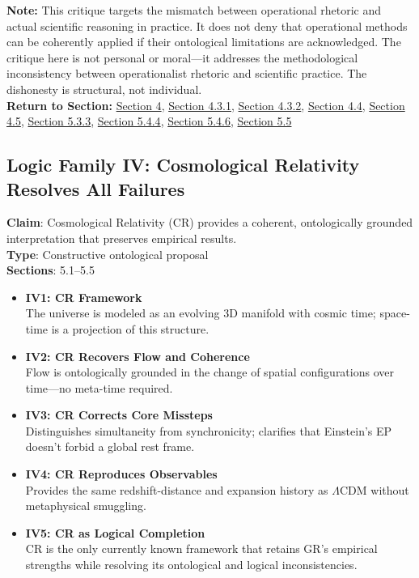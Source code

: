 \documentclass[12pt]{book}
\begin{document}
\textbf{Note:} This critique targets the mismatch between operational rhetoric and actual scientific reasoning in practice. It does not deny that operational methods can be coherently applied if their ontological limitations are acknowledged. The critique here is not personal or moral---it addresses the methodological inconsistency between operationalist rhetoric and scientific practice. The dishonesty is structural, not individual.\\
\textbf{Return to Section:} \hyperref[sec:4]{Section 4}, \hyperref[sec:4.3.1]{Section 4.3.1}, \hyperref[sec:4.3.2]{Section 4.3.2}, \hyperref[sec:4.4]{Section 4.4}, \hyperref[sec:4.5]{Section 4.5}, \hyperref[sec:5.3.3]{Section 5.3.3}, \hyperref[sec:5.4.4]{Section 5.4.4}, \hyperref[sec:5.4.6]{Section 5.4.6}, \hyperref[sec:5.5]{Section 5.5}

\vspace{1em}

\subsection*{Logic Family IV: Cosmological Relativity Resolves All Failures}
\textbf{Claim}: Cosmological Relativity (CR) provides a coherent, ontologically grounded interpretation that preserves empirical results.\\
\textbf{Type}: Constructive ontological proposal\\
\textbf{Sections}: 5.1–5.5
\begin{itemize}
  \item \textbf{IV1: CR Framework} \\
  The universe is modeled as an evolving 3D manifold with cosmic time; space-time is a projection of this structure.
  \item \textbf{IV2: CR Recovers Flow and Coherence} \\
  Flow is ontologically grounded in the change of spatial configurations over time---no meta-time required.
  \item \textbf{IV3: CR Corrects Core Missteps} \\
  Distinguishes simultaneity from synchronicity; clarifies that Einstein's EP doesn't forbid a global rest frame.
  \item \textbf{IV4: CR Reproduces Observables} \\
  Provides the same redshift-distance and expansion history as $\Lambda$CDM without metaphysical smuggling.
  \item \textbf{IV5: CR as Logical Completion} \\
  CR is the only currently known framework that retains GR's empirical strengths while resolving its ontological and logical inconsistencies.
\end{itemize}
\end{document}
